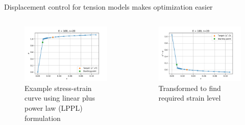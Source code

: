 \begin{frame}
Displacement control for tension models makes optimization easier
\begin{columns}[t]
\begin{column}{0.45\textwidth}
\begin{figure}[tbp]
\centering
\includegraphics[width=0.9\columnwidth]{secant-1}
\caption{\label{fig:secant-1}Example stress-strain curve using linear plus power law (LPPL) formulation}
\end{figure}
\end{column}
\begin{column}{0.45\textwidth}
\begin{figure}[tbp]
\centering
\includegraphics[width=0.9\columnwidth]{secant-2}
\caption{\label{fig:secant-2}Transformed to find required strain level}
\end{figure}
\end{column}
\end{columns}
\note{
\vfill
}
\end{frame}

